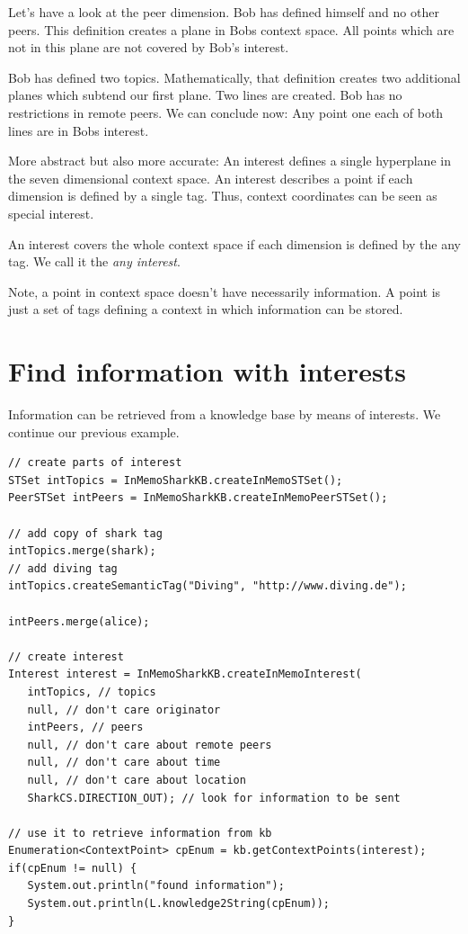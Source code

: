 Let's have a look at the peer dimension. Bob has defined himself and no other peers. This definition creates a plane in Bobs context space. All points which are not in this plane are not covered by Bob's interest.

Bob has defined two topics. Mathematically, that definition creates two additional planes which subtend our first plane. Two lines are created. Bob has no restrictions in remote peers. We can conclude now: Any point one each of both lines are in Bobs interest. 

More abstract but also more accurate: An interest defines a single hyperplane in the seven dimensional context space. An interest describes a point if each dimension is defined by a single tag. Thus, context coordinates can be seen as special interest.

An interest covers the whole context space if each dimension is defined by the any tag. We call it the {\it any interest}.

Note, a point in context space doesn't have necessarily information. A point is just a set of tags defining a context in which information can be stored.

\section{Find information with interests}
Information can be retrieved from a knowledge base by means of interests.
We continue our previous example.

\begin{verbatim}
// create parts of interest
STSet intTopics = InMemoSharkKB.createInMemoSTSet();
PeerSTSet intPeers = InMemoSharkKB.createInMemoPeerSTSet();

// add copy of shark tag
intTopics.merge(shark);
// add diving tag
intTopics.createSemanticTag("Diving", "http://www.diving.de");

intPeers.merge(alice);

// create interest
Interest interest = InMemoSharkKB.createInMemoInterest(
   intTopics, // topics
   null, // don't care originator
   intPeers, // peers
   null, // don't care about remote peers
   null, // don't care about time
   null, // don't care about location
   SharkCS.DIRECTION_OUT); // look for information to be sent

// use it to retrieve information from kb
Enumeration<ContextPoint> cpEnum = kb.getContextPoints(interest);
if(cpEnum != null) {
   System.out.println("found information");
   System.out.println(L.knowledge2String(cpEnum));
}
\end{verbatim}

